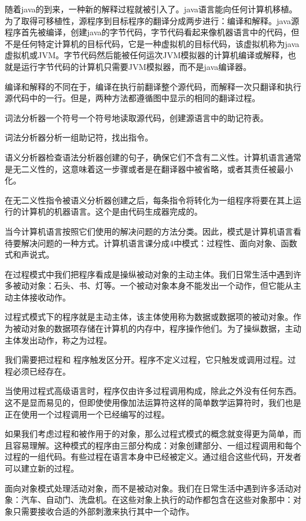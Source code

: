 随着java的到来，一种新的解释过程就被引入了。java语言能向任何计算机移植。为了取得可移植性，源程序到目标程序的翻译分成两步进行：编译和解释。java源程序首先被编译，创建java的字节代码，字节代码看起来像机器语言中的代码，但不是任何特定计算机的目标代码，它是一种虚拟机的目标代码，该虚拟机称为java虚拟机或JVM。字节代码然后能被任何运次JVM模拟器的计算机编译或解释，也就是运行字节代码的计算机只需要JVM模拟器，而不是java编译器。

编译和解释的不同在于，编译在执行前翻译整个源代码，而解释一次只翻译和执行源代码中的一行。但是，两种方法都遵循图中显示的相同的翻译过程。

词法分析器一个符号一个符号地读取源代码，创建源语言中的助记符表。

词法分析器分析一组助记符，找出指令。

语义分析器检查语法分析器创建的句子，确保它们不含有二义性。计算机语言通常是无二义性的，这意味着这一步骤或者是在翻译器中被省略，或者其责任被最小化。

在无二义性指令被语义分析器创建之后，每条指令将转化为一组程序将要在其上运行的计算机的机器语言。这个是由代码生成器完成的。

当今计算机语言按照它们使用的解决问题的方法分类。因此，模式是计算机语言看待要解决问题的一种方式。计算机语言课分成4中模式：过程性、面向对象、函数式和声说式。

在过程模式中我们把程序看成是操纵被动对象的主动主体。我们日常生活中遇到许多被动对象：石头、书、灯等。一个被动对象本身不能发出一个动作，但它能从主动主体接收动作。

过程式模式下的程序就是主动主体，该主体使用称为数据或数据项的被动对象。作为被动对象的数据项存储在计算机的内存中，程序操作他们。为了操纵数据，主动主体发出动作，称之为过程。

我们需要把过程和 程序触发区分开。程序不定义过程，它只触发或调用过程。过程必须已经存在。

当使用过程式高级语言时，程序仅由许多过程调用构成，除此之外没有任何东西。这不是显而易见的，但即使使用像加法运算符这样的简单数学运算符时，我们也是正在使用一个过程调用一个已经编写的过程。

如果我们考虑过程和被作用于的对象，那么过程式模式的概念就变得更为简单，而且容易理解。这种模式的程序由三部分构成：对象创建部分、一组过程调用和每个过程的一组代码。有些过程在语言本身中已经被定义。通过组合这些代码，开发者可以建立新的过程。

面向对象模式处理活动对象，而不是被动对象。我们在日常生活中遇到许多活动对象：汽车、自动门、洗盘机。在这些对象上执行的动作都包含在这些对象那中：对象只需要接收合适的外部刺激来执行其中一个动作。

